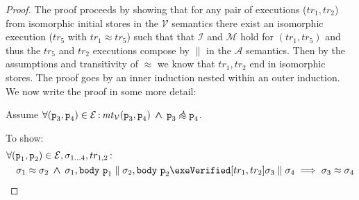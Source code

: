 \documentclass[runningheads,a4paper]{llncs}
\DeclareMathOperator{\band}{\bm{\;\land\;}}
\DeclareMathOperator{\suchthat}{:}
\newcommand*{\qvars}[2]{#1_{#2}}
\newcommand*{\cardinality}[1]{\left|{#1}\right|}
\newcommand{\tr}{tr}
\newcommand*{\sima}[1]{%
  \mathrel{\vcenter{\offinterlineskip
  \hbox{$\scriptscriptstyle\,\mathcal{#1}$}\vskip-.00ex\hbox{$\sim$}\vskip-.35ex\hbox{$\sim$}}}}
\newcommand*\iso{\approx}
\newcommand*\isoa{\sima{A}}
\newcommand*{\equivmap}{\mathcal{E}}
\newcommand*{\parcomp}{\parallel}
\newcommand*{\muttermname}{\mathit{mt}}
\newcommand*{\mutterm}[3]{{\muttermname}_{#1}(#2,#3)}
\newcommand*\Asemantics{\mathcal{A}}
\newcommand*\asemantics{$\Asemantics$ semantics}
\newcommand*\Vsemantics{\mathcal{V}}
\newcommand*\vsemantics{$\Vsemantics$ semantics}
\newcommand*{\body}{\mathtt{body}}
\newcommand*{\fun}{\texttt{p}}
\newcommand*{\isoR}{\mathcal{I}}
\newcommand*{\mutR}{\mathcal{M}}
\newcommand*{\store}{\sigma}
\newcommand*{\isoref}{\hyperref[def:global isomorphism]{\ensuremath{\iso}}}
\begin{document}
\begin{proof}
The proof proceeds by showing that for any pair of executions ($\tr_1,\tr_2$) from isomorphic initial stores in the \vsemantics{} there exist an isomorphic execution ($\tr_5$ with $\tr_1\iso\tr_5$) such that that $\isoR$ and $\mutR$ hold for $(\tr_1,\tr_5)$ and thus the $\tr_5$ and $\tr_2$ executions compose by $\parcomp$ in the \asemantics{}.
%
Then by the assumptions and transitivity of \isoref{} we know that $\tr_1,\tr_2$ end in isomorphic stores.
%
The proof goes by an inner induction nested within an outer induction. We now write the proof in some more detail:

Assume $\forall (\fun_3,\fun_4) \in \equivmap \suchthat \mutterm{\Vsemantics}{\fun_3}{\fun_4} \band \fun_3 \isoa \fun_4$.

To show:
\[\begin{aligned}
&\forall (\fun_1,\fun_2) \in \equivmap, \qvars{\store}{1 \ldots 4}, \qvars{\tr}{1,2} \suchthat  \\
&\quad	\store_1 \iso \store_2 \band
        \store_1,\body~\fun_1 \parcomp \store_2,\body~\fun_2 \exeVerified[\tr_1,\tr_2] \store_3 \parcomp \store_4
	\implies
	\store_3 \iso \store_4
\end{aligned}\]

%


\end{proof}
\end{document}
